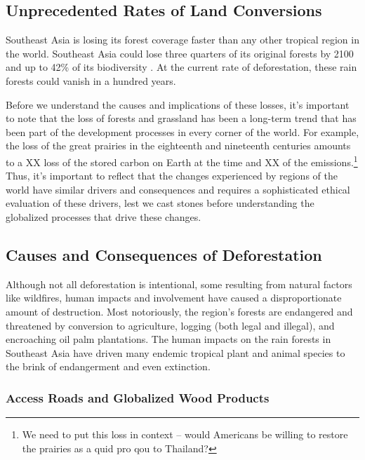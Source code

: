 \subsection{Unprecedented Rates of Land Conversions}

Southeast Asia is losing its forest coverage faster than any other tropical region in the world. Southeast Asia could lose three quarters of its original forests by 2100 and up to 42\% of its biodiversity \citep{sodhi2004southeast}. At the current rate of deforestation, these rain forests could vanish in a hundred years. 

Before we understand the causes and implications of these losses, it's important to note that the loss of forests and grassland has been a long-term trend that has been part of the development processes in every corner of the world. For example, the loss of the great prairies in the eighteenth and nineteenth centuries amounts to a XX loss of the stored carbon on Earth at the time and XX of the \CO emissions.\footnote{We need to put this loss in context -- would Americans be willing to restore the prairies as a quid pro qou to Thailand?} Thus, it's important to reflect that the changes experienced by regions of the world have similar drivers and consequences and requires a sophisticated ethical evaluation of these drivers, lest we cast stones before understanding the globalized processes that drive these changes. 

\subsection{Causes and Consequences of Deforestation}

Although not all deforestation is intentional, some resulting from natural factors like wildfires, human impacts and involvement have caused a disproportionate amount of destruction. Most notoriously, the region's forests are endangered and threatened by conversion to agriculture, logging (both legal and illegal), and encroaching oil palm plantations. The human impacts on the rain forests in Southeast Asia have driven many endemic tropical plant and animal species to the brink of endangerment and even extinction. 

\subsubsection{Access Roads and Globalized Wood Products}

